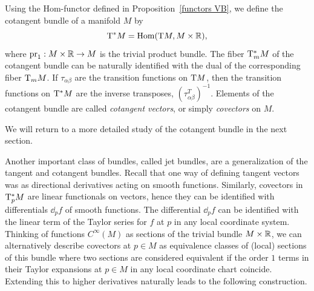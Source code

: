 \begin{defn}
    Using the Hom-functor defined in Proposition~\ref{functors VB}, we define the cotangent bundle of a manifold $M$ by 
    \[\mathrm{T}^\ast M=\operatorname{Hom}(\mathrm{T} M,M\times\mathbb{R}),\]
    where $\operatorname{pr}_1:M\times\mathbb{R}\to M$ is the trivial product bundle. The fiber $\mathrm{T}^\ast_m M$ of the cotangent bundle can be naturally identified with the dual of the corresponding fiber $\mathrm{T}_mM$. If $\tau_{\alpha\beta}$ are the transition functions on $\mathrm{T} M$, then the transition functions on $\mathrm{T}^\ast M$ are the inverse transposes, $(\tau_{\alpha\beta}^T)^{-1}$. Elements of the cotangent bundle are called \emph{cotangent vectors}, or simply \emph{covectors} on $M$.
\end{defn}
We will return to a more detailed study of the cotangent bundle in the next section.

Another important class of bundles, called jet bundles, are a generalization of the tangent and cotangent bundles. Recall that one way of defining tangent vectors was as directional derivatives acting on smooth functions. Similarly, covectors in $\mathrm{T}_p^\ast M$ are linear functionals on vectors, hence they can be identified with differentials $\dd_p f$ of smooth functions. The differential $\dd_p f$ can be identified with the linear term of the Taylor series for $f$ at $p$ in any local coordinate system. Thinking of functions $C^\infty(M)$ as sections of the trivial bundle $M\times\mathbb{R}$, we can alternatively describe covectors at $p\in M$ as equivalence classes of (local) sections of this bundle where two sections are considered equivalent if the order $1$ terms in their Taylor expansions at $p\in M$ in any local coordinate chart coincide. Extending this to higher derivatives naturally leads to the following construction.

